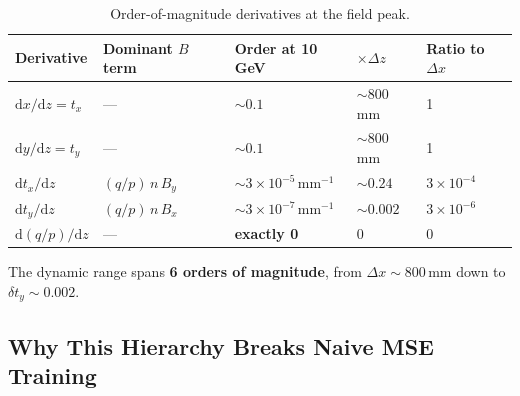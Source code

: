 \documentclass[11pt,a4paper]{article}
\begin{document}
\begin{table}[h]
\centering
\caption{Order-of-magnitude derivatives at the field peak.}
\label{tab:hierarchy}
\begin{tabular}{lllll}
\toprule
\textbf{Derivative} & \textbf{Dominant $B$ term} & \textbf{Order at 10\,GeV} & \textbf{$\times \Delta z$} & \textbf{Ratio to $\Delta x$} \\
\midrule
$\mathrm{d}x/\mathrm{d}z = t_x$
  & --- & $\sim 0.1$       & $\sim 800$\,mm & 1 \\
$\mathrm{d}y/\mathrm{d}z = t_y$
  & --- & $\sim 0.1$       & $\sim 800$\,mm & 1 \\
$\mathrm{d}t_x/\mathrm{d}z$
  & $(q/p)\,n\,B_y$ & $\sim 3 \times 10^{-5}$\,mm$^{-1}$
  & $\sim 0.24$   & $3 \times 10^{-4}$ \\
$\mathrm{d}t_y/\mathrm{d}z$
  & $(q/p)\,n\,B_x$ & $\sim 3 \times 10^{-7}$\,mm$^{-1}$
  & $\sim 0.002$  & $3 \times 10^{-6}$ \\
$\mathrm{d}(q/p)/\mathrm{d}z$
  & --- & \textbf{exactly 0} & 0 & 0 \\
\bottomrule
\end{tabular}
\end{table}

The dynamic range spans \textbf{6 orders of magnitude}, from $\Delta x
\sim 800$\,mm down to $\delta t_y \sim 0.002$.

\subsection{Why This Hierarchy Breaks Naive MSE Training}
\end{document}
